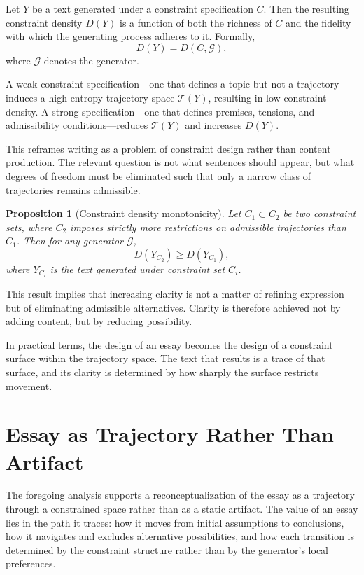 \documentclass[12pt, oneside]{article}
\theoremstyle{plain}
\newtheorem{proposition}[theorem]{Proposition}
\theoremstyle{definition}
\theoremstyle{remark}
\begin{document}
Let $Y$ be a text generated under a constraint specification $C$. Then the
resulting constraint density $D(Y)$ is a function of both the richness of $C$
and the fidelity with which the generating process adheres to it. Formally,
\[
  D(Y) = D(C, \mathcal{G}),
\]
where $\mathcal{G}$ denotes the generator.

A weak constraint specification---one that defines a topic but not a trajectory---induces
a high-entropy trajectory space $\mathcal{T}(Y)$, resulting in low constraint density.
A strong specification---one that defines premises, tensions, and admissibility
conditions---reduces $\mathcal{T}(Y)$ and increases $D(Y)$.

This reframes writing as a problem of constraint design rather than content production.
The relevant question is not what sentences should appear, but what degrees of freedom
must be eliminated such that only a narrow class of trajectories remains admissible.

\begin{proposition}[Constraint density monotonicity]
Let $C_1 \subset C_2$ be two constraint sets, where $C_2$ imposes strictly more
restrictions on admissible trajectories than $C_1$. Then for any generator $\mathcal{G}$,
\[
  D(Y_{C_2}) \geq D(Y_{C_1}),
\]
where $Y_{C_i}$ is the text generated under constraint set $C_i$.
\end{proposition}

This result implies that increasing clarity is not a matter of refining expression
but of eliminating admissible alternatives. Clarity is therefore achieved not by
adding content, but by reducing possibility.

In practical terms, the design of an essay becomes the design of a constraint surface
within the trajectory space. The text that results is a trace of that surface, and
its clarity is determined by how sharply the surface restricts movement.

\section{Essay as Trajectory Rather Than Artifact}

The foregoing analysis supports a reconceptualization of the essay as a trajectory through
a constrained space rather than as a static artifact. The value of an essay lies in the
path it traces: how it moves from initial assumptions to conclusions, how it navigates and
excludes alternative possibilities, and how each transition is determined by the constraint
structure rather than by the generator's local preferences.
\end{document}
